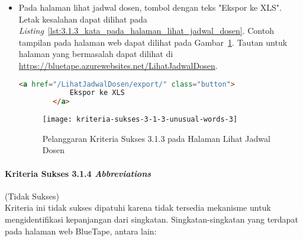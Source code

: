\begin{itemize}
    \item Pada halaman lihat jadwal dosen, tombol dengan teks "Ekspor ke XLS". Letak kesalahan dapat dilihat pada \mbox{\textit{Listing} \ref{lst:3.1.3_kata_pada_halaman_lihat_jadwal_dosen}}. Contoh tampilan pada halaman web dapat dilihat pada \mbox{Gambar \ref{fig:3.1.3_unusual_words_3}}. Tautan untuk halaman yang bermasalah dapat dilihat di \url{https://bluetape.azurewebsites.net/LihatJadwalDosen}.
    \begin{lstlisting}[frame=single, label={lst:3.1.3_kata_pada_halaman_lihat_jadwal_dosen}, language=HTML, caption=Pelanggaran Kriteria Sukses 3.1.3 pada Halaman Lihat Jadwal Dosen]
        <a href="/LihatJadwalDosen/export/" class="button">
            Ekspor ke XLS
        </a>
    \end{lstlisting}
    
    \begin{figure}[H]
        \centering  
        \texttt{[image: kriteria-sukses-3-1-3-unusual-words-3]}  
        \caption[Pelanggaran Kriteria Sukses 3.1.3 pada Halaman Lihat Jadwal Dosen]{Pelanggaran Kriteria Sukses 3.1.3 pada Halaman Lihat Jadwal Dosen}
        \label{fig:3.1.3_unusual_words_3}  
    \end{figure}
    
\end{itemize}

\paragraph{Kriteria Sukses 3.1.4 \textit{Abbreviations}}
\label{par:kepatuhan_bluetape_kriteria_sukses_3.1.4}
(Tidak Sukses)\\

Kriteria ini tidak sukses dipatuhi karena tidak tersedia mekanisme untuk mengidentifikasi kepanjangan dari singkatan. Singkatan-singkatan yang terdapat pada halaman web BlueTape, antara lain:

